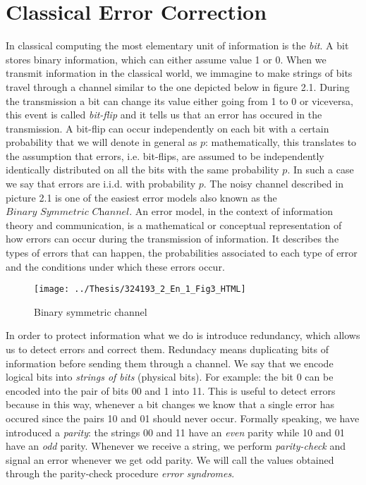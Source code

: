 \documentclass{Configuration_Files/PoliMi3i_thesis}
\begin{document}
\section{Classical Error Correction}
\label{sec:CER}

In classical computing the most elementary unit of information is the {\it bit}. A bit stores binary information, which can either assume value 1 or 0. When we transmit information in the classical world, we immagine to make strings of bits travel through a channel similar to the one depicted below in figure 2.1. During the transmission a bit can change its value either going from 1 to 0 or viceversa, this event is called {\it bit-flip} and it tells us that an error has occured in the transmission. A bit-flip can occur independently on each bit with a certain probability that we will denote in general as $p$: mathematically, this translates to the assumption that errors, i.e. bit-flips,  are assumed to be independently identically distributed on all the bits with the same probability $p$. In such a case we say that errors are i.i.d. with probability $p$.\newline
The noisy channel described in picture 2.1 is one of the easiest error models also known as the $\textit{Binary Symmetric Channel}$. An error model, in the context of information theory and communication, is a mathematical or conceptual representation of how errors can occur during the transmission of information. It describes the types of errors that can happen, the probabilities associated to each type of error and the conditions under which these errors occur. \newline

\begin{figure}
	\centering
	\texttt{[image: ../Thesis/324193\_2\_En\_1\_Fig3\_HTML]}
	\caption{{ Binary symmetric channel \cite{Cha06}}}
	\label{fig:3241932en1fig3html}
\end{figure}


\newpage
In order to protect information what we do is introduce redundancy, which allows us to detect errors and correct them. Redundacy means duplicating bits of information before sending them through a channel. We say that we encode logical bits into {\it strings of bits} (physical bits). For example: the bit 0 can be encoded into the pair of bits 00 and 1 into 11. This is useful to detect errors because in this way, whenever a bit changes we know that a single error has occured since the pairs 10 and 01 should never occur. Formally speaking, we have introduced a {\it parity}: the strings 00 and 11 have an {\it even} parity while 10 and 01 have an {\it odd} parity. Whenever we receive a string, we perform {\it parity-check} and signal an error whenever we get odd parity. We will call the values obtained through the parity-check procedure {\it error syndromes}.\newline
\end{document}
